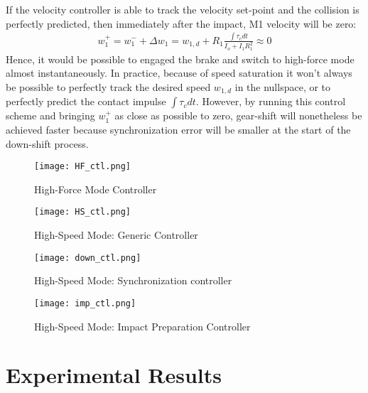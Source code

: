 If the velocity controller is able to track the velocity set-point and the collision is perfectly predicted, then immediately after the impact, M1 velocity will be zero:
%
\begin{align}
w_1^+ =  w_1^- + \Delta w_1 = w_{1,d}  + R_1 \frac{\int{\tau_c dt}}{I_o + I_1 R_1^2} \approx 0
\label{eq:dsdm_impact_vel}
\end{align}
%
Hence, it would be possible to engaged the brake and switch to high-force mode almost instantaneously. In practice, because of speed saturation it won't always be possible to perfectly track the desired speed $w_{1,d}$ in the nullspace, or to perfectly predict the contact impulse $\int{\tau_c dt}$. However, by running this control scheme and bringing $w_1^+$ as close as possible to zero, gear-shift will nonetheless be achieved faster because synchronization error will be smaller at the start of the down-shift process.

\begin{figure}[p]
	\centering
		\texttt{[image: HF\_ctl.png]}
	\caption{High-Force Mode Controller}
	\label{fig:HF_loop}
\end{figure}

\begin{figure}[p]
	\centering
		\texttt{[image: HS\_ctl.png]}
	\caption{High-Speed Mode: Generic Controller}
	\label{fig:HS_loop}
\end{figure}

\begin{figure}[p]
	\centering
		\texttt{[image: down\_ctl.png]}
	\caption{High-Speed Mode: Synchronization controller}
	\label{fig:down_loop}
\end{figure}

\begin{figure}[p]
	\centering
		\texttt{[image: imp\_ctl.png]}
	\caption{High-Speed Mode: Impact Preparation Controller}
	\label{fig:imp_loop}
\end{figure}


\section{Experimental Results}
\label{sec:dsdm_exp}

